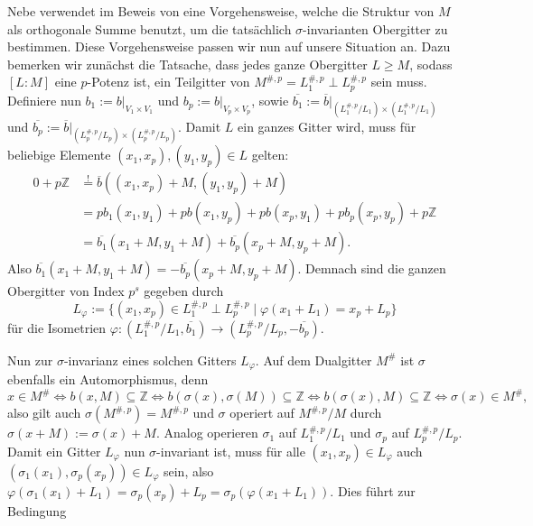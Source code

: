 \documentclass[12pt,a4paper,halfparskip,headsepline,bibtotocnumbered]{scrreprt}
\theoremstyle{nummermitklammern}
\theoremstyle{nonumberbreak}
\newcommand{\Z}{\mathbb{Z}}
\begin{document}
Nebe verwendet im Beweis von \cite[Theorem (5.9)]{nebe} eine Vorgehensweise, welche die Struktur von $M$ als orthogonale Summe benutzt, um die tatsächlich $\sigma$-invarianten Obergitter zu bestimmen. Diese Vorgehensweise passen wir nun auf unsere Situation an. Dazu bemerken wir zunächst die Tatsache, dass jedes ganze Obergitter $L \geq M$, sodass $[L : M]$ eine $p$-Potenz ist, ein Teilgitter von $M^{\#,p} = L_1^{\#,p} \perp L_p^{\#,p}$ sein muss. Definiere nun $b_1 := b \vert_{V_1 \times V_1}$ und $b_p := b \vert_{V_p \times V_p}$, sowie $\overline{b_1} := \overline{b}\vert_{(L_1^{\#,p} / L_1) \times (L_1^{\#,p} / L_1)}$ und $\overline{b_p} := \overline{b}\vert_{(L_p^{\#,p} / L_p) \times (L_p^{\#,p} / L_p)}$. Damit $L$ ein ganzes Gitter wird, muss für beliebige Elemente $(x_1, x_p), (y_1, y_p) \in L$ gelten:
\begin{align*}
	0 + p\Z &\stackrel{!}{=} \overline{b}((x_1,x_p) + M, (y_1, y_p) + M)\\
	&= pb_1(x_1,y_1) + pb(x_1, y_p) + pb(x_p, y_1) + pb_p(x_p, y_p) + p\Z\\
	&= \overline{b_1}(x_1+M, y_1 + M) + \overline{b_p}(x_p+M, y_p+M).
\end{align*}
Also $\overline{b_1}(x_1+M, y_1+M) = - \overline{b_p}(x_p+M, y_p+M)$. Demnach sind die ganzen Obergitter von Index $p^s$ gegeben durch
\begin{equation*}
	L_\varphi := \lbrace (x_1,x_p) \in L_1^{\#,p} \perp L_p^{\#,p} \mid \varphi(x_1+L_1) = x_p + L_p \rbrace
\end{equation*}
für die Isometrien $\varphi : (L_1^{\#,p} / L_1, \overline{b_1}) \rightarrow (L_p^{\#,p} / L_p, -\overline{b_p})$.\par
Nun zur $\sigma$-invarianz eines solchen Gitters $L_\varphi$. Auf dem Dualgitter $M^\#$ ist $\sigma$ ebenfalls ein Automorphismus, denn
\begin{equation*}
	x \in M^\# \Leftrightarrow b(x,M) \subseteq \Z \Leftrightarrow b(\sigma(x), \sigma(M)) \subseteq \Z \Leftrightarrow b(\sigma(x), M) \subseteq \Z \Leftrightarrow \sigma(x) \in M^\#,
\end{equation*}
also gilt auch $\sigma(M^{\#,p}) = M^{\#,p}$ und $\sigma$ operiert auf $M^{\#,p}/M$ durch\linebreak
$\sigma(x+M) := \sigma(x) + M$. Analog operieren $\sigma_1$ auf $L_1^{\#,p}/L_1$ und $\sigma_p$ auf $L_p^{\#,p}/L_p$. Damit ein Gitter $L_\varphi$ nun $\sigma$-invariant ist, muss für alle $(x_1,x_p) \in L_\varphi$ auch $(\sigma_1(x_1), \sigma_p(x_p)) \in L_\varphi$ sein, also $\varphi(\sigma_1(x_1) + L_1) = \sigma_p(x_p) + L_p = \sigma_p(\varphi(x_1 + L_1))$. Dies führt zur Bedingung
\end{document}

